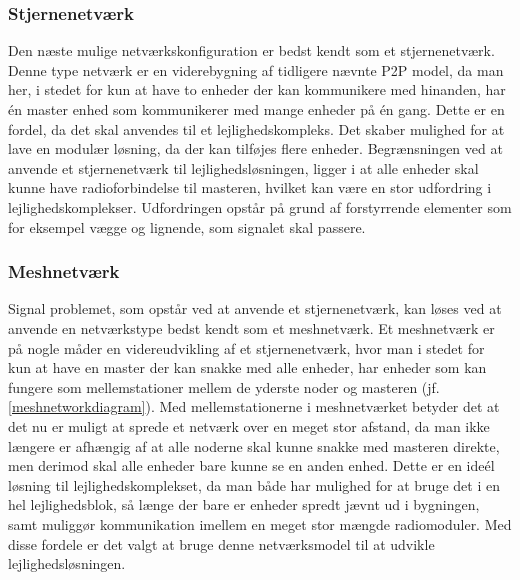 \subsubsection*{Stjernenetværk}
Den næste mulige netværkskonfiguration  er bedst kendt som et stjernenetværk. Denne type netværk er en viderebygning af tidligere nævnte P2P model, da man her, i stedet for kun at have to enheder der kan kommunikere med hinanden, har én master enhed som kommunikerer med mange enheder på én gang. 
Dette er en fordel, da det skal anvendes til et lejlighedskompleks. Det skaber mulighed for at lave en modulær løsning, da der kan tilføjes flere enheder.
Begrænsningen ved at anvende et stjernenetværk til lejlighedsløsningen, ligger i at alle enheder skal kunne have radioforbindelse til masteren, hvilket kan være en stor udfordring i lejlighedskomplekser. Udfordringen opstår på grund af forstyrrende elementer som for eksempel vægge og lignende, som signalet skal passere.
\newpage
\subsubsection*{Meshnetværk}
Signal problemet, som opstår ved at anvende et stjernenetværk, kan løses ved at anvende en netværkstype bedst kendt som et meshnetværk.
Et meshnetværk er på nogle måder en videreudvikling af et stjernenetværk, hvor man i stedet for kun at have en master der kan snakke med alle enheder, har enheder som kan fungere som mellemstationer mellem de yderste noder og masteren (jf. \ref{meshnetworkdiagram}).
\newline
Med mellemstationerne i meshnetværket betyder det at det nu er muligt at sprede et netværk over en meget stor afstand, da man ikke længere er afhængig af at alle noderne skal kunne snakke med masteren direkte, men derimod skal alle enheder bare kunne se en anden enhed. Dette er en ideél løsning til lejlighedskomplekset, da man både har mulighed for at bruge det i en hel lejlighedsblok, så længe der bare er enheder spredt jævnt ud i bygningen, samt muliggør kommunikation imellem en meget stor mængde radiomoduler. Med disse fordele er det valgt at bruge denne netværksmodel til at udvikle lejlighedsløsningen.


